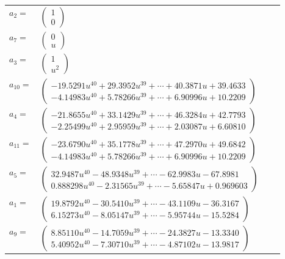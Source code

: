 \documentclass[1p]{elsarticle_modified}
\theoremstyle{definition}
\begin{document}
\begin{tabular}{m{7pt} m{180pt} m{7pt} m{180pt} }
\flushright $a_{2}=$&$\begin{pmatrix}1\\0\end{pmatrix}$ \\
\flushright $a_{7}=$&$\begin{pmatrix}0\\u\end{pmatrix}$ \\
\flushright $a_{3}=$&$\begin{pmatrix}1\\u^2\end{pmatrix}$ \\
\flushright $a_{10}=$&$\begin{pmatrix}-19.5291 u^{40}+29.3952 u^{39}+\cdots+40.3871 u+39.4633\\-4.14983 u^{40}+5.78266 u^{39}+\cdots+6.90996 u+10.2209\end{pmatrix}$ \\
\flushright $a_{4}=$&$\begin{pmatrix}-21.8655 u^{40}+33.1429 u^{39}+\cdots+46.3284 u+42.7793\\-2.25499 u^{40}+2.95959 u^{39}+\cdots+2.03087 u+6.60810\end{pmatrix}$ \\
\flushright $a_{11}=$&$\begin{pmatrix}-23.6790 u^{40}+35.1778 u^{39}+\cdots+47.2970 u+49.6842\\-4.14983 u^{40}+5.78266 u^{39}+\cdots+6.90996 u+10.2209\end{pmatrix}$ \\
\flushright $a_{5}=$&$\begin{pmatrix}32.9487 u^{40}-48.9348 u^{39}+\cdots-62.9983 u-67.8981\\0.888298 u^{40}-2.31565 u^{39}+\cdots-5.65847 u+0.969603\end{pmatrix}$ \\
\flushright $a_{1}=$&$\begin{pmatrix}19.8792 u^{40}-30.5410 u^{39}+\cdots-43.1109 u-36.3167\\6.15273 u^{40}-8.05147 u^{39}+\cdots-5.95744 u-15.5284\end{pmatrix}$ \\
\flushright $a_{9}=$&$\begin{pmatrix}8.85110 u^{40}-14.7059 u^{39}+\cdots-24.3827 u-13.3340\\5.40952 u^{40}-7.30710 u^{39}+\cdots-4.87102 u-13.9817\end{pmatrix}$ \\

\end{tabular}
\end{document}

